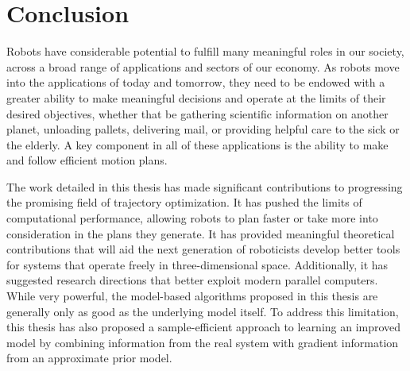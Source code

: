 \documentclass[../root.tex]{subfiles}
\begin{document}
\chapter{Conclusion} \label{chap:conclusion}
Robots have considerable potential to fulfill many meaningful roles 
in our society, across a broad range of applications and sectors of 
our economy. As robots move into the applications of today and tomorrow,
they need to be endowed with a greater ability to make meaningful 
decisions and operate at the limits of their desired objectives, 
whether that be gathering scientific information on another planet,
unloading pallets, delivering mail, or providing helpful care to 
the sick or the elderly. A key component in all of these applications 
is the ability to make and follow efficient motion plans.

The work detailed in this thesis has made significant contributions to
progressing the promising field of trajectory optimization. It has pushed the
limits of computational performance, allowing robots to plan faster or take
more into consideration in the plans they generate. It has provided
meaningful theoretical contributions that will aid the next generation of
roboticists develop better tools for systems that operate freely in
three-dimensional space. Additionally, it has suggested research directions
that better exploit modern parallel computers. While very powerful, the 
model-based algorithms proposed in this thesis are generally only as good 
as the underlying model itself. To address this limitation, this thesis
has also proposed a sample-efficient approach to learning an improved model by 
combining information from the real system with gradient information from an 
approximate prior model.
\end{document}
